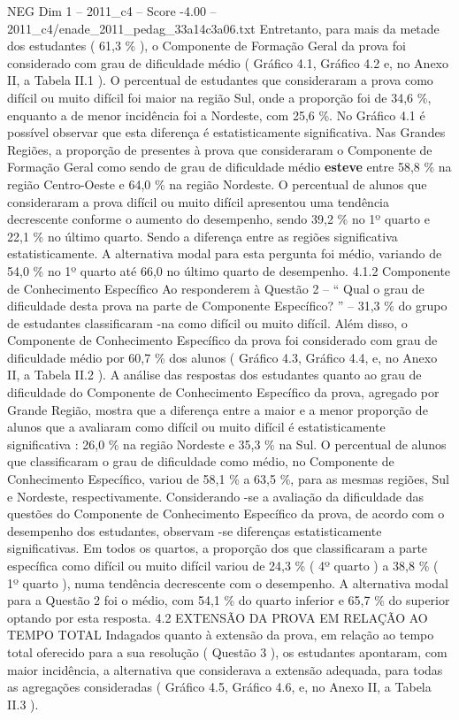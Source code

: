 \begin{textsample}{NEG Dim 1 – 2011\_c4 – Score -4.00 – 2011\_c4/enade\_2011\_pedag\_33a14c3a06.txt}
Entretanto, para mais da metade dos estudantes ( 61,3 \% ), o Componente de Formação Geral da prova foi considerado com grau de dificuldade médio ( Gráfico 4.1, Gráfico 4.2 e, no Anexo II, a Tabela II.1 ).
O percentual de estudantes que consideraram a prova como difícil ou muito difícil foi maior na região Sul, onde a proporção foi de 34,6 \%, enquanto a de menor incidência foi a Nordeste, com 25,6 \%.
No Gráfico 4.1 é possível observar que esta diferença é estatisticamente significativa.
Nas Grandes Regiões, a proporção de presentes à prova que consideraram o Componente de Formação Geral como sendo de grau de dificuldade médio \textbf{esteve} entre 58,8 \% na região Centro-Oeste e 64,0 \% na região Nordeste.
O percentual de alunos que consideraram a prova difícil ou muito difícil apresentou uma tendência decrescente conforme o aumento do desempenho, sendo 39,2 \% no 1º quarto e 22,1 \% no último quarto.
Sendo a diferença entre as regiões significativa estatisticamente.
A alternativa modal para esta pergunta foi médio, variando de 54,0 \% no 1º quarto até 66,0 no último quarto de desempenho. 4.1.2 Componente de Conhecimento Específico Ao responderem à Questão 2 – “ Qual o grau de dificuldade desta prova na parte de Componente Específico? ” – 31,3 \% do grupo de estudantes classificaram -na como difícil ou muito difícil.
Além disso, o Componente de Conhecimento Específico da prova foi considerado com grau de dificuldade médio por 60,7 \% dos alunos ( Gráfico 4.3, Gráfico 4.4, e, no Anexo II, a Tabela II.2 ).
A análise das respostas dos estudantes quanto ao grau de dificuldade do Componente de Conhecimento Específico da prova, agregado por Grande Região, mostra que a diferença entre a maior e a menor proporção de alunos que a avaliaram como difícil ou muito difícil é estatisticamente significativa : 26,0 \% na região Nordeste e 35,3 \% na Sul.
O percentual de alunos que classificaram o grau de dificuldade como médio, no Componente de Conhecimento Específico, variou de 58,1 \% a 63,5 \%, para as mesmas regiões, Sul e Nordeste, respectivamente.
Considerando -se a avaliação da dificuldade das questões do Componente de Conhecimento Específico da prova, de acordo com o desempenho dos estudantes, observam -se diferenças estatisticamente significativas.
Em todos os quartos, a proporção dos que classificaram a parte específica como difícil ou muito difícil variou de 24,3 \% ( 4º quarto ) a 38,8 \% ( 1º quarto ), numa tendência decrescente com o desempenho.
A alternativa modal para a Questão 2 foi o médio, com 54,1 \% do quarto inferior e 65,7 \% do superior optando por esta resposta. 4.2 EXTENSÃO DA PROVA EM RELAÇÃO AO TEMPO TOTAL Indagados quanto à extensão da prova, em relação ao tempo total oferecido para a sua resolução ( Questão 3 ), os estudantes apontaram, com maior incidência, a alternativa que considerava a extensão adequada, para todas as agregações consideradas ( Gráfico 4.5, Gráfico 4.6, e, no Anexo II, a Tabela II.3 ).

\end{textsample}
